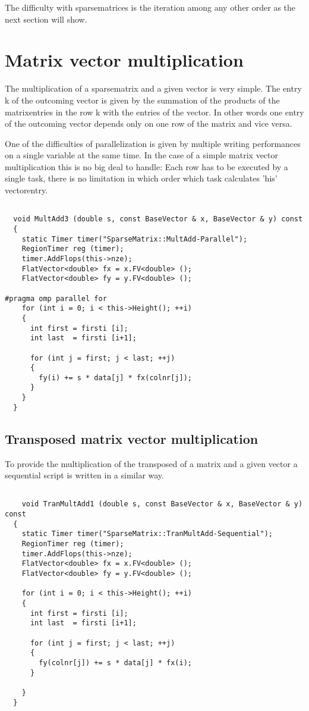 \documentclass[a4paper,11pt]{scrartcl}
\begin{document}
The difficulty with sparsematrices is the iteration among any other order as 
the next section will show.

\section{Matrix vector multiplication}

The multiplication of a sparsematrix and a given vector is very simple. 
The entry k of the outcoming vector is given by the summation of the products 
of the matrixentries in the row k with the entries of the vector. In other 
words one entry of the outcoming vector depends only on one row of the matrix 
and vice versa.

One of the difficulties of parallelization is given by multiple writing 
performances on a single variable at the same time. In the case of a simple
 matrix vector multiplication this is no big deal to handle: Each row has to be
executed by a single task, there is no limitation in which order which task
 calculates 'his' vectorentry.

\begin{lstlisting}

  void MultAdd3 (double s, const BaseVector & x, BaseVector & y) const
  {
    static Timer timer("SparseMatrix::MultAdd-Parallel");
    RegionTimer reg (timer);
    timer.AddFlops(this->nze);
    FlatVector<double> fx = x.FV<double> ();
    FlatVector<double> fy = y.FV<double> ();

#pragma omp parallel for
    for (int i = 0; i < this->Height(); ++i)
    {
      int first = firsti [i];
      int last  = firsti [i+1];

      for (int j = first; j < last; ++j)
      {
        fy(i) += s * data[j] * fx(colnr[j]);
      }
    }
  }

\end{lstlisting}

\subsection{Transposed matrix vector multiplication}

To provide the multiplication of the transposed of a matrix and a given vector
 a sequential script is written in a similar way.

\begin{lstlisting}

	void TranMultAdd1 (double s, const BaseVector & x, BaseVector & y) const
  {
    static Timer timer("SparseMatrix::TranMultAdd-Sequential");
    RegionTimer reg (timer);
    timer.AddFlops(this->nze);
    FlatVector<double> fx = x.FV<double> ();
    FlatVector<double> fy = y.FV<double> ();

    for (int i = 0; i < this->Height(); ++i)
    {
      int first = firsti [i];
      int last  = firsti [i+1];

      for (int j = first; j < last; ++j)
      {
        fy(colnr[j]) += s * data[j] * fx(i);
      }

    }
  }


\end{lstlisting}
\end{document}
